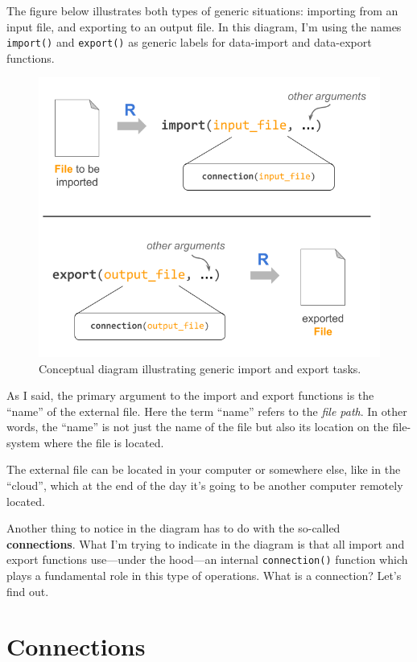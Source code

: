 \documentclass[
]{book}
\begin{document}
The figure below illustrates both types of generic situations: importing
from an input file, and exporting to an output file. In this diagram, I'm using
the names \texttt{import()} and \texttt{export()} as generic labels for data-import and
data-export functions.

\begin{figure}

{\centering \includegraphics[width=0.7\linewidth]{images/inout/import-export-functions} 

}

\caption{Conceptual diagram illustrating generic import and export tasks.}\label{fig:unnamed-chunk-362}
\end{figure}

As I said, the primary argument to the import and export functions is the
``name'' of the external file. Here the term ``name'' refers to the \emph{file path}.
In other words, the ``name'' is not just the name of the file but also its
location on the file-system where the file is located.

The external file can be located in your computer or somewhere else, like
in the ``cloud'', which at the end of the day it's going to be another
computer remotely located.

Another thing to notice in the diagram has to do with the so-called
\textbf{connections}. What I'm trying to indicate in the diagram is that all import
and export functions use---under the hood---an internal \texttt{connection()} function
which plays a fundamental role in this type of operations. What is a connection?
Let's find out.

\hypertarget{connections}{%
\section{Connections}\label{connections}}
\end{document}
